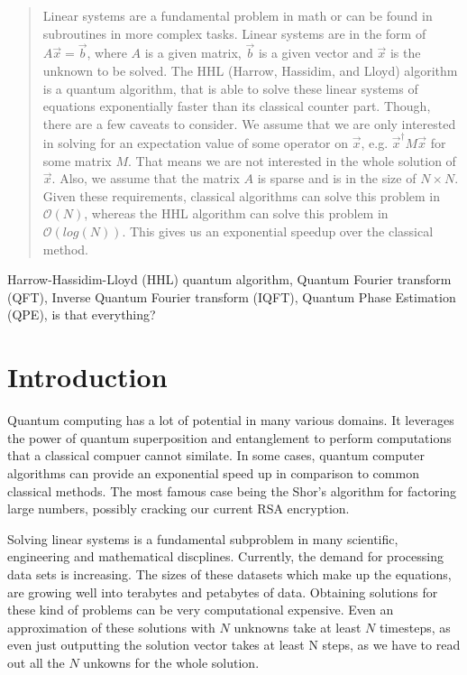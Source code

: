 


\begin{abstract}
Linear systems are a fundamental problem in math or can be found in subroutines in more complex tasks.
Linear systems are in the form of $A \vec x = \vec b$, where $A$ is a given matrix, $\vec b$ is a given vector and $\vec x$ is the unknown to be solved.
The HHL (Harrow, Hassidim, and Lloyd) algorithm is a quantum algorithm, that is able to solve these linear systems of equations exponentially faster than its classical counter part. 
Though, there are a few caveats to consider.
We assume that we are only interested in solving for an expectation value of some operator on $\vec x$, e.g. $\vec{x}^\dagger M \vec x$ for some matrix $M$.
That means we are not interested in the whole solution of $\vec x$.
Also, we assume that the matrix $A$ is sparse and is in the size of $N\times N$. 
Given these requirements, classical algorithms can solve this problem in $\mathcal{O}(N )$, whereas the HHL algorithm can solve this problem in $\mathcal{O}(log (N) )$.
This gives us an exponential speedup over the classical method.
\end{abstract}

\begin{IEEEkeywords}
Harrow-Hassidim-Lloyd (HHL) quantum algorithm, 
Quantum Fourier transform (QFT), 
Inverse Quantum Fourier transform (IQFT), 
Quantum Phase Estimation (QPE),
is that everything?
\end{IEEEkeywords}



\section{Introduction}


Quantum computing has a lot of potential in many various domains. 
It leverages the power of quantum superposition and entanglement to perform computations that a classical compuer cannot similate.
In some cases, quantum computer algorithms can provide an exponential speed up in comparison to common classical methods.
The most famous case being the Shor's algorithm for factoring large numbers, possibly cracking our current RSA encryption.

Solving linear systems is a fundamental subproblem in many scientific, engineering and mathematical discplines. 
Currently, the demand for processing data sets is increasing. 
The sizes of these datasets which make up the equations, are growing well into terabytes and petabytes of data.
Obtaining solutions for these kind of problems can be very computational expensive.
Even an approximation of these solutions with $N$ unknowns take at least $N$ timesteps, as even just outputting the solution vector takes at least N steps, as we have to read out all the $N$ unkowns for the whole solution.

